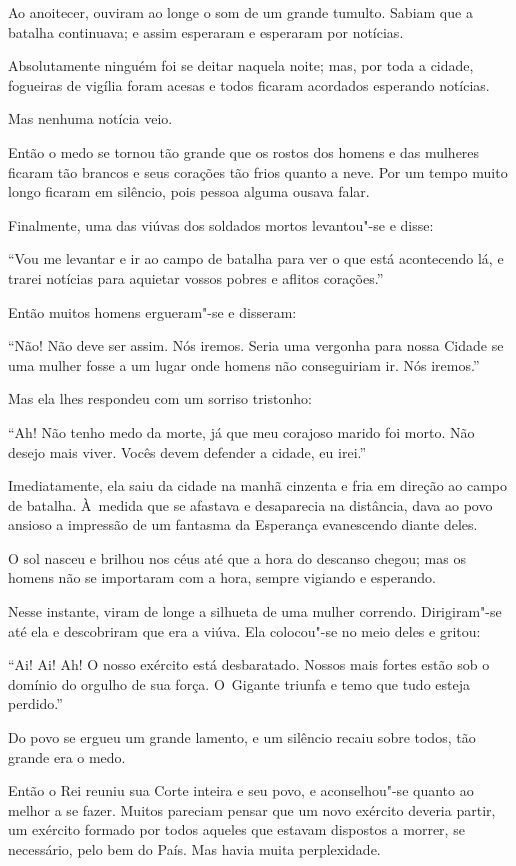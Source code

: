Ao anoitecer, ouviram ao longe o som de um grande tumulto. Sabiam que a
batalha continuava; e assim esperaram e esperaram por notícias.

Absolutamente ninguém foi se deitar naquela noite; mas, por toda a
cidade, fogueiras de vigília foram acesas e todos ficaram acordados
esperando notícias.

Mas nenhuma notícia veio.

Então o medo se tornou tão grande que os rostos dos homens e das
mulheres ficaram tão brancos e seus corações tão frios quanto a neve.
Por um tempo muito longo ficaram em silêncio, pois pessoa alguma ousava
falar.

Finalmente, uma das viúvas dos soldados mortos levantou"-se e disse:

``Vou me levantar e ir ao campo de batalha para ver o que está
acontecendo lá, e trarei notícias para aquietar vossos pobres e aflitos
corações.''

Então muitos homens ergueram"-se e disseram:

``Não! Não deve ser assim. Nós iremos. Seria uma vergonha para nossa
Cidade se uma mulher fosse a um lugar onde homens não conseguiriam ir.
Nós iremos.''

Mas ela lhes respondeu com um sorriso tristonho:

``Ah! Não tenho medo da morte, já que meu corajoso marido foi morto. Não
desejo mais viver. Vocês devem defender a cidade, eu irei.''

Imediatamente, ela saiu da cidade na manhã cinzenta e fria em direção ao
campo de batalha. À~medida que se afastava e desaparecia na distância,
dava ao povo ansioso a impressão de um fantasma da Esperança evanescendo
diante deles.

O sol nasceu e brilhou nos céus até que a hora do descanso chegou; mas
os homens não se importaram com a hora, sempre vigiando e esperando.

Nesse instante, viram de longe a silhueta de uma mulher correndo.
Dirigiram"-se até ela e descobriram que era a viúva. Ela colocou"-se no
meio deles e gritou:

``Ai! Ai! Ah! O nosso exército está desbaratado. Nossos mais fortes
estão sob o domínio do orgulho de sua força. O~Gigante triunfa e temo
que tudo esteja perdido.''

Do povo se ergueu um grande lamento, e um silêncio recaiu sobre todos, tão
grande era o medo.

Então o Rei reuniu sua Corte inteira e seu povo, e aconselhou"-se quanto
ao melhor a se fazer. Muitos pareciam pensar que um novo exército
deveria partir, um exército formado por todos aqueles que estavam dispostos a
morrer, se necessário, pelo bem do País. Mas havia muita perplexidade.

